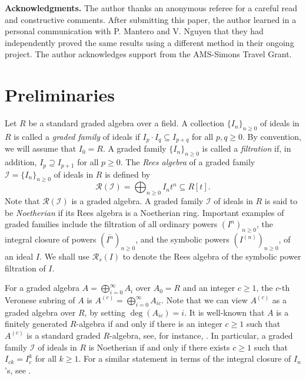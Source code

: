 \documentclass[12pt]{amsart}
\numberwithin{equation}{section}
\theoremstyle{definition}
\def\I{{\mathcal I}}
\def\R{{\mathcal R}}
\def\R{{\mathcal R}}
\begin{document}
\par
\vspace{1em}
\noindent
{\bf Acknowledgments.}
The author thanks an anonymous referee for a careful read and constructive comments. After submitting this paper, the author learned in a personal communication with P. Mantero and V. Nguyen that they had independently proved the same results using a different method in their ongoing project. The author acknowledges support from the AMS-Simons Travel Grant.


\section{Preliminaries}

Let $R$ be a standard graded algebra over a field. A collection $\{I_n\}_{n \ge 0}$ of ideals in $R$ is called a \emph{graded family} of ideals if $I_p \cdot I_q \subseteq I_{p+q}$ for all $p, q \ge 0$. By convention, we will assume that $I_0 = R$. A graded family $\{I_n\}_{n \ge 0}$ is called a \emph{filtration} if, in addition, $I_p \supseteq I_{p+1}$ for all $p \ge 0$.
The \emph{Rees algebra} of a graded family $\I = \{I_n\}_{n \ge 0}$ of ideals in $R$ is defined by
		$$\R(\I) = \bigoplus_{n \ge 0} I_nt^n \subseteq R[t].$$
Note that $\R(\I)$ is a graded algebra. A graded family $\I$ of ideals in $R$ is said to be \emph{Noetherian} if its Rees algebra is a Noetherian ring. Important examples of graded families include the filtration of all ordinary powers $(I^n)_{n\ge 0}$, the integral closure of powers $(\overline{I^n})_{n\ge 0}$, and the symbolic powers $(I^{(n)})_{n\ge 0}$, of an ideal $I$. We shall use $\R_s(I)$ to denote the Rees algebra of the symbolic power filtration of $I$.



For a graded algebra $A=\bigoplus_{i=0}^\infty A_i$ over $A_0=R$ and an integer $c \ge 1$, the $c$-th Veronese subring  of $A$ is 
$A^{(c)}=\bigoplus_{i=0}^\infty A_{ic}$.
Note that we can view $A^{(c)}$ as a graded algebra over $R$, by setting $\deg(A_{ic})=i$.
It is well-known that $A$ is a finitely generated $R$-algebra if and only if there is an integer $c \ge 1$ such that $A^{(c)}$ is a standard graded $R$-algebra, see, for instance, \cite[Theorem 2.1]{HHT2007}. In particular, a graded family $\I$ of ideals in $R$ is Noetherian if and only if there exists $c \ge 1$ such that $I_{ck}=I_c^k$ for all $k\ge 1$. For a similar statement in terms of the integral closure of $I_n$'s, see \cite[Theorem 3.4]{TaiThaiNOBody}.\par
\end{document}
